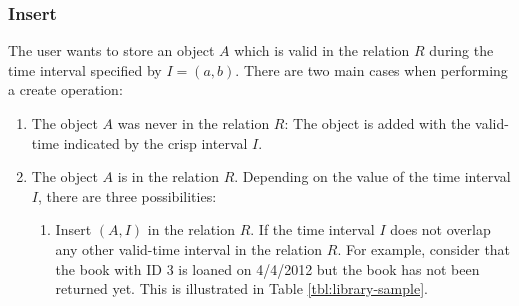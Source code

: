 \subsubsection{\label{subsubsec:insert}Insert}
The user wants to store an object $A$ which is valid in the relation $R$ during the time interval specified by $I = \left(a, b \right)$.
%
%
There are two main cases when performing a create operation:
\begin{enumerate}
\item The object $A$ was never in the relation $R$: The object is added with the valid-time indicated by the crisp interval $I$. 


\item The object $A$ is in the relation $R$. Depending on the value of the time interval $I$, there are three possibilities:
	\begin{enumerate}
	\item Insert $\left(A, I\right)$ in the relation $R$. If the time interval $I$ does not overlap any other valid-time interval in the relation $R$. For example, consider that the book with ID 3 is loaned on 4/4/2012 but the book has not been returned yet. This is illustrated in Table \ref{tbl:library-sample}.



\end{enumerate}
\end{enumerate}
